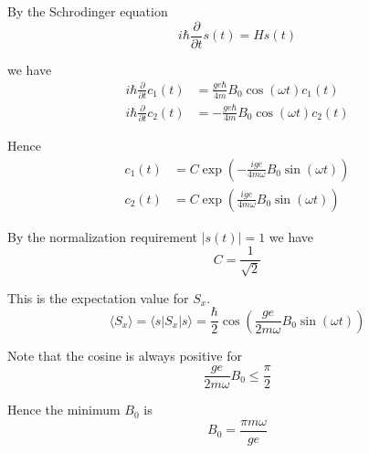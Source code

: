 By the Schrodinger equation
\begin{equation*}
i\hbar\frac{\partial}{\partial t}s(t)=Hs(t)
\end{equation*}

we have
\begin{align*}
i\hbar\frac{\partial}{\partial t}c_1(t)&=\frac{ge\hbar}{4m}B_0\cos(\omega t)c_1(t)
\\
i\hbar\frac{\partial}{\partial t}c_2(t)&=-\frac{ge\hbar}{4m}B_0\cos(\omega t)c_2(t)
\end{align*}

Hence
\begin{equation*}
\begin{aligned}
c_1(t)&=C\exp\left(-\frac{ige}{4m\omega}B_0\sin(\omega t)\right)
\\
c_2(t)&=C\exp\left(\frac{ige}{4m\omega}B_0\sin(\omega t)\right)
\end{aligned}
\tag{1}
\end{equation*}

By the normalization requirement $|s(t)|=1$ we have
\begin{equation*}
C=\frac{1}{\sqrt2}
\end{equation*}

This is the expectation value for $S_x$.
\begin{equation*}
\langle S_x\rangle=\langle s|S_x|s\rangle
=\frac{\hbar}{2}\cos\left(\frac{ge}{2m\omega}B_0\sin(\omega t)\right)
\tag{2}
\end{equation*}

Note that the cosine is always positive for
\begin{equation*}
\frac{ge}{2m\omega}B_0\le\frac{\pi}{2}
\end{equation*}

Hence the minimum $B_0$ is
\begin{equation*}
B_0=\frac{\pi m\omega}{ge}
\end{equation*}



